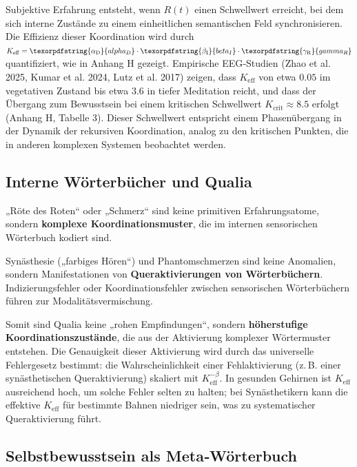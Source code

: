 \documentclass[12pt,a4paper]{article}
\DeclareRobustCommand{\alD}{\texorpdfstring{\ensuremath{\alpha_{\mathrm{D}}}}{alpha_D}}
\DeclareRobustCommand{\beI}{\texorpdfstring{\ensuremath{\beta_{\mathrm{I}}}}{beta_I}}
\DeclareRobustCommand{\gaR}{\texorpdfstring{\ensuremath{\gamma_{\mathrm{R}}}}{gamma_R}}
\newcommand{\eff}{\mathrm{eff}}
\newcommand{\Ke}{K_{\eff}}
\newcommand{\Kcrit}{K_{\mathrm{crit}}}
\begin{document}
	Subjektive Erfahrung entsteht, wenn $R(t)$ einen Schwellwert erreicht, bei dem sich interne Zustände zu einem einheitlichen semantischen Feld synchronisieren. Die Effizienz dieser Koordination wird durch $\Ke = \alD \cdot \beI \cdot \gaR$ quantifiziert, wie in Anhang H gezeigt. Empirische EEG‑Studien (Zhao et al. 2025, Kumar et al. 2024, Lutz et al. 2017) zeigen, dass $\Ke$ von etwa $0.05$ im vegetativen Zustand bis etwa $3.6$ in tiefer Meditation reicht, und dass der Übergang zum Bewusstsein bei einem kritischen Schwellwert $\Kcrit \approx 8.5$ erfolgt (Anhang H, Tabelle 3). Dieser Schwellwert entspricht einem Phasenübergang in der Dynamik der rekursiven Koordination, analog zu den kritischen Punkten, die in anderen komplexen Systemen beobachtet werden.
	
	\subsection{Interne Wörterbücher und Qualia}
	
	„Röte des Roten“ oder „Schmerz“ sind keine primitiven Erfahrungsatome, sondern \textbf{komplexe Koordinationsmuster}, die im internen sensorischen Wörterbuch kodiert sind.
	
	\begin{tcolorbox}[title=Beispiel: Synästhesie und Phantomschmerzen]
		Synästhesie („farbiges Hören“) und Phantomschmerzen sind keine Anomalien, sondern Manifestationen von \textbf{Queraktivierungen von Wörterbüchern}. Indizierungsfehler oder Koordinationsfehler zwischen sensorischen Wörterbüchern führen zur Modalitätsvermischung.
	\end{tcolorbox}
	
	Somit sind Qualia keine „rohen Empfindungen“, sondern \textbf{höherstufige Koordinationszustände}, die aus der Aktivierung komplexer Wörtermuster entstehen. Die Genauigkeit dieser Aktivierung wird durch das universelle Fehlergesetz bestimmt: die Wahrscheinlichkeit einer Fehlaktivierung (z. B. einer synästhetischen Queraktivierung) skaliert mit $\Ke^{-\beta}$. In gesunden Gehirnen ist $\Ke$ ausreichend hoch, um solche Fehler selten zu halten; bei Synästhetikern kann die effektive $\Ke$ für bestimmte Bahnen niedriger sein, was zu systematischer Queraktivierung führt.
	
	\subsection{Selbstbewusstsein als Meta‑Wörterbuch}
	
\end{document}
